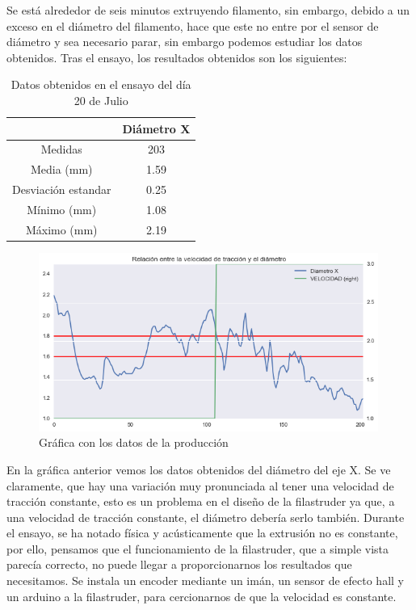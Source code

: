 Se está alrededor de seis minutos extruyendo filamento, sin embargo, debido a un exceso en el diámetro del filamento, hace que este no entre por el sensor de diámetro y sea necesario parar, sin embargo podemos estudiar los datos obtenidos.
Tras el ensayo, los resultados obtenidos son los siguientes:

\begin{table}[H]
    \centering
    \begin{tabular}{cc}
               & Diámetro X \\ \hline
    Medidas    & 203        \\
    Media (mm) & 1.59       \\
    Desviación estandar & 0.25\\
    Mínimo (mm)   & 1.08       \\
    Máximo (mm)   & 2.19      
    \end{tabular}
    \caption{Datos obtenidos en el ensayo del día 20 de Julio}
    \label{tab:20007105-dat}
\end{table}


\begin{figure}[H]
    \centering
    \includegraphics[width=0.99\textwidth]{images/producciones/20072015/graficas.png}
    \caption{Gráfica con los datos de la producción}
    \label{fig:2007105-graf}
\end{figure}

En la gráfica anterior vemos los datos obtenidos del diámetro del eje X. Se ve claramente, que hay una variación muy pronunciada al tener una velocidad de tracción constante, esto es un problema en el diseño de la filastruder ya que, a una velocidad de tracción constante, el diámetro debería serlo también. Durante el ensayo, se ha notado física y acústicamente que la extrusión no es constante, por ello, pensamos que el funcionamiento de la filastruder, que a simple vista parecía correcto, no puede llegar a proporcionarnos los resultados que necesitamos. Se instala un encoder mediante un imán, un sensor de efecto hall y un arduino a la filastruder, para cercionarnos de que la velocidad es constante.

